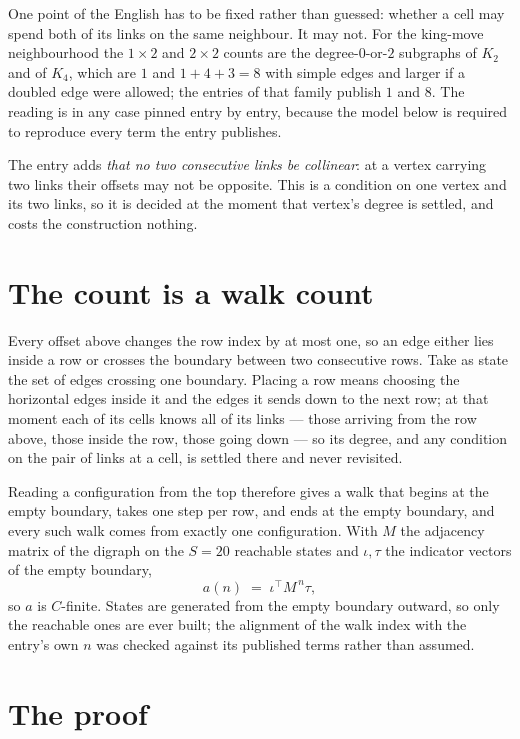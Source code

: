 \documentclass[11pt,a4paper]{article}
\theoremstyle{plain}
\theoremstyle{definition}
\begin{document}
One point of the English has to be fixed rather than guessed: whether a cell may spend both of
its links on the same neighbour. It may not. For the king-move neighbourhood the $1\times2$
and $2\times2$ counts are the degree-$0$-or-$2$ subgraphs of $K_2$ and of $K_4$, which are $1$
and $1+4+3=8$ with simple edges and larger if a doubled edge were allowed; the entries of that
family publish $1$ and $8$. The reading is in any case pinned entry by entry, because the
model below is required to reproduce every term the entry publishes.

The entry adds \emph{that no two consecutive links be collinear}: at a vertex carrying two
links their offsets may not be opposite. This is a condition on one vertex and its two links,
so it is decided at the moment that vertex's degree is settled, and costs the construction
nothing.

\section{The count is a walk count}

Every offset above changes the row index by at most one, so an edge either lies inside a row
or crosses the boundary between two consecutive rows. Take as state the set of edges crossing
one boundary. Placing a row means choosing the horizontal edges inside it and the edges it
sends down to the next row; at that moment each of its cells knows all of its links --- those
arriving from the row above, those inside the row, those going down --- so its degree, and any
condition on the pair of links at a cell, is settled there and never revisited.

Reading a configuration from the top therefore gives a walk that begins at the empty boundary,
takes one step per row, and ends at the empty boundary, and every such walk comes from exactly
one configuration. With $M$ the adjacency matrix of the digraph on the $S=20$ reachable
states and $\iota,\tau$ the indicator vectors of the empty boundary,
\[
a(n)\;=\;\iota^{\!\top}M^{\,n}\tau ,
\]
so $a$ is $C$-finite. States are generated from the empty boundary outward, so only the
reachable ones are ever built; the alignment of the walk index with the entry's own $n$ was
checked against its published terms rather than assumed.

\section{The proof}
\end{document}
